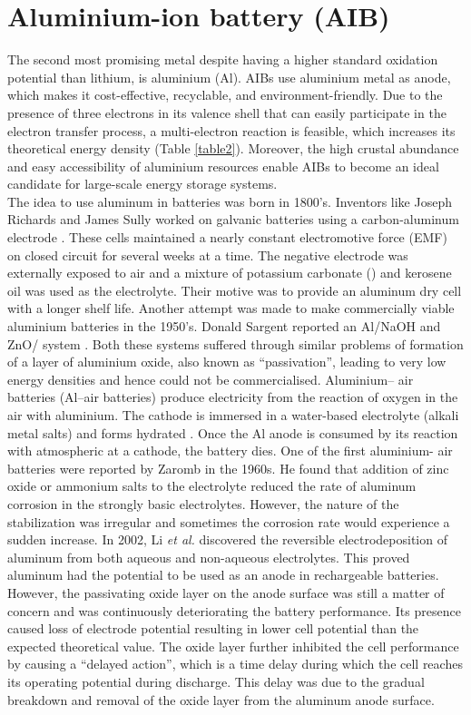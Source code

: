 \section{Aluminium-ion battery (AIB)}
The second most promising metal despite having a higher standard oxidation potential than lithium, is aluminium (Al). AIBs use aluminium metal as anode, which makes it cost-effective, recyclable, and environment-friendly. Due to the presence of three electrons in its valence shell that can easily participate in the electron transfer process, a multi-electron reaction is feasible, which increases its theoretical energy density (Table \ref{table2}). Moreover, the high crustal abundance and easy accessibility of aluminium resources enable AIBs to become an ideal candidate for large-scale energy storage systems. \\
The idea to use aluminum in batteries was born in 1800's. Inventors like Joseph Richards and James Sully worked on galvanic batteries using a carbon-aluminum electrode \cite{sully_james_1897,richards_aluminum_1887}. These cells maintained a nearly constant electromotive force (EMF) on closed circuit for several weeks at a time. The negative electrode was externally exposed to air and a mixture of potassium carbonate () and kerosene oil was used as the electrolyte. Their motive was to provide an aluminum dry cell with a longer shelf life. Another attempt was made to make commercially viable aluminium batteries in the 1950's. Donald Sargent reported an Al/NaOH and ZnO/ system . Both these systems suffered through similar problems of formation of a layer of aluminium oxide, also known as \enquote{passivation}, leading to very low energy densities and hence could not be commercialised. Aluminium– air batteries (Al–air batteries) produce electricity from the reaction of oxygen in the air with aluminium. The cathode is immersed in a water-based electrolyte (alkali metal salts) and forms hydrated . Once the Al anode is consumed by its reaction with atmospheric  at a cathode, the battery dies. One of the first aluminium- air batteries were reported by Zaromb\cite{zaromb_use_1962} in the 1960s. He found that addition of zinc oxide or ammonium salts to the electrolyte reduced the rate of aluminum corrosion in the strongly basic electrolytes. However, the nature of the stabilization was irregular and sometimes the corrosion rate would experience a sudden increase\cite{bockstie_control_1963}. In 2002, Li \textit{et al.} discovered the reversible electrodeposition of aluminum from both aqueous and non-aqueous electrolytes\cite{li_aluminum_2002}. This proved aluminum had the potential to be used as an anode in rechargeable batteries. However, the passivating oxide layer on the anode surface was still a matter of concern and was continuously deteriorating the battery performance. Its presence caused loss of electrode potential resulting in lower cell potential than the expected theoretical value. The oxide layer further inhibited the cell performance by causing a \enquote{delayed action}, which is a time delay during which the cell reaches its operating potential during discharge. This delay was due to the gradual breakdown and removal of the oxide layer from the aluminum anode surface. 